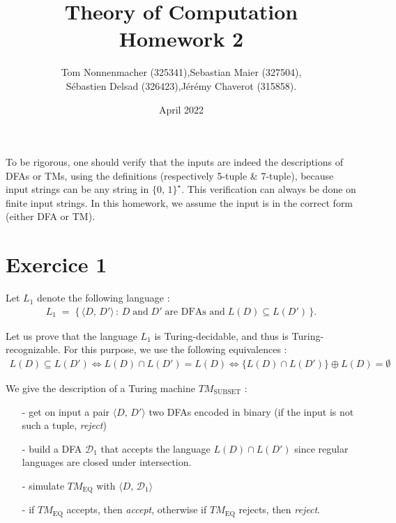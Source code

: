 \documentclass{article}
\title{Theory of Computation \\ Homework 2}
\author{Tom Nonnenmacher (325341),\quad Sebastian Maier (327504),\\ Sébastien Delsad (326423),\quad Jérémy Chaverot (315858).}
\date{April 2022}
\begin{document}
\maketitle

To be rigorous, one should verify that the inputs are indeed the descriptions of DFAs or TMs, using the definitions (respectively 5-tuple \& 7-tuple), because input strings can be any string in $\{0,\,1\}^\star$. This verification can always be done on finite input strings. In this homework, we assume the input is in the correct form (either DFA or TM).
\section*{Exercice 1}
Let $L_1$ denote the following language :
\begin{align*}
    L_1\; =\;\{\,\langle D,\, D'\rangle\,:\,D\;\text{and}\;D'\;\text{are DFAs and}\;L(D)\subseteq L(D')\,\}.
\end{align*}

\noindent Let us prove that the language $L_1$ is Turing-decidable, and thus is Turing-recognizable. For this purpose, we use the following equivalences : 
\begin{align*}
L(D)\subseteq L(D')\Leftrightarrow L(D)\cap L(D') = L(D)\Leftrightarrow \{L(D)\cap L(D')\}\oplus L(D)=\emptyset
\end{align*}

\noindent We give the description of a Turing machine $TM_{\text{SUBSET}}$ :
\begin{itemize}
    \item [-] get on input a pair $\langle D,\, D'\rangle$ two DFAs encoded in binary (if the input is not such a tuple, \textit{reject})
    \item [-] build a DFA $\mathcal{D}_1$ that accepts the language $L(D)\cap L(D')$ since regular languages are closed under intersection.
    \item [-] simulate $TM_{\text{EQ}}$ with $\langle D,\, \mathcal{D}_1\rangle$
    \item [-] if $TM_{\text{EQ}}$ accepts, then \textit{accept}, otherwise if $TM_{\text{EQ}}$ rejects, then \textit{reject}.
\end{itemize}
\end{document}
